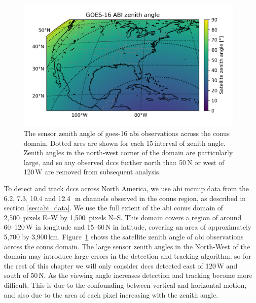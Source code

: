 \begin{figure}[tp]
    \centering
    \includegraphics[width=\textwidth]{figures/chapter2_01.png}
    \caption[
    The sensor zenith angle of \acrshort{goes}-16 \acrshort{abi} observations across the \acrshort{conus} domain
    ]{
    The sensor zenith angle of \acrshort{goes}-16 \acrshort{abi} observations across the \acrshort{conus} domain. Dotted arcs are shown for each 15\,\textdegree interval of zenith angle. Zenith angles in the north-west corner of the domain are particularly large, and so any observed \acrshort{dcc}s further north than 50\,\textdegree N or west of 120\,\textdegree W are removed from subsequent analysis.
    }
    \label{fig:abi_zenith_angles}
\end{figure}

To detect and track \acrshort{dcc}s across North America, we use \acrshort{abi} \acrshort{mcmip} data from the 6.2, 7.3, 10.4 and 12.4\,\unit{\mu m} channels observed in the \acrshort{conus} region, as described in section \ref{sec:abi_data}.
We use the full extent of the \acrshort{abi} \acrshort{conus} domain of 2,500~pixels E--W by 1,500~pixels N--S.
This domain covers a region of around 60--120\,\textdegree W in longitude and 15--60\,\textdegree N in latitude, covering an area of approximately 5,700 by 3,900\,\unit{km}.
Figure~\ref{fig:abi_zenith_angles} shows the satellite zenith angle of \acrshort{abi} observations across the \acrshort{conus} domain.
The large sensor zenith angles in the North-West of the domain may introduce large errors in the detection and tracking algorithm, so for the rest of this chapter we will only consider \acrshort{dcc}s detected east of 120\,\textdegree W and south of 50\,\textdegree N.
As the viewing angle increases detection and tracking become more difficult.
This is due to the confounding between vertical and horizontal motion, and also due to the area of each pixel increasing with the zenith angle.

